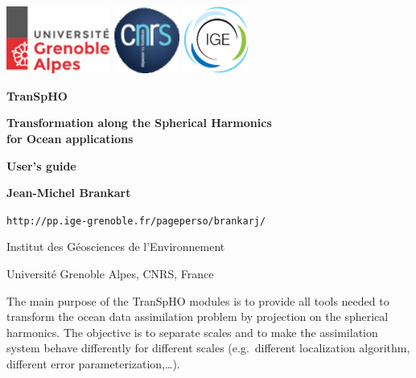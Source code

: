\documentclass[11pt]{article}
\begin{document}
\pagestyle{empty}

\centerline{
\includegraphics[height=22mm]{Logos/logo_uga.png}
\hspace{5mm}
\includegraphics[height=22mm]{Logos/logo_cnrs.png}
\hfill
\includegraphics[height=22mm]{Logos/logo_ige.png}
}

\vspace{20mm}

\begin{center}

{\Huge\bf TranSpHO}

\vspace{10mm}

{\Large\bf Transformation along the Spherical Harmonics\\for Ocean applications}

\vspace{10mm}

{\Large\bf User's guide}

\vspace{10mm}

{\large\bf Jean-Michel Brankart}

\vspace{5mm}
{\tt http://pp.ige-grenoble.fr/pageperso/brankarj/}

\vspace{5mm}
{\large Institut des G\'eosciences de l'Environnement}

\vspace{1mm}
{\large Universit\'e Grenoble Alpes, CNRS, France}

\end{center}

\vspace{20mm}
The main purpose of the TranSpHO modules is to provide all tools needed
to transform the ocean data assimilation problem
by projection on the spherical harmonics.
The objective is to separate scales and
to make the assimilation system behave differently for different scales
(e.g.\ different localization algorithm,
different error parameterization,\ldots).
\end{document}
